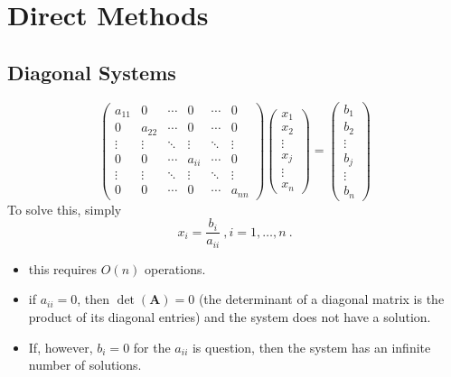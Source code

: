 \documentclass[12pt]{article}
\newcommand{\ve}[1]{\ensuremath{\mathbf{#1}}}
\begin{document}
\section{Direct Methods}

\subsection{Diagonal Systems}
\begin{equation}
   \begin{pmatrix}
      a_{11} & 0      & \cdots & 0      & \cdots & 0 \\
      0      & a_{22} & \cdots & 0      & \cdots & 0 \\
      \vdots & \vdots & \ddots & \vdots & \ddots & \vdots \\     
      0      & 0      & \cdots & a_{ii} & \cdots & 0 \\
      \vdots & \vdots & \ddots & \vdots & \ddots & \vdots \\
      0      & 0      & \cdots & 0      & \cdots & a_{nn} 
    \end{pmatrix} 
    \begin{pmatrix} x_1 \\ x_2 \\ \vdots \\ x_j \\ \vdots \\ x_n \end{pmatrix} =
    \begin{pmatrix} b_1 \\ b_2 \\ \vdots \\ b_j \\ \vdots \\ b_n \end{pmatrix}
    \nonumber   
\end{equation} 
%
To solve this, simply
%
\[x_i = \frac{b_i}{a_{ii}} \:, i=1,\dots,n\:.\]
%
\begin{itemize}
\item this requires $O(n)$ operations.
\item if $a_{ii}=0$, then $\det(\ve{A})=0$ (the determinant of a diagonal matrix is the product of its diagonal entries) and the system does not have a solution.
\item If, however, $b_i = 0$ for the $a_{ii}$ is question, then the system has an infinite number of solutions.
\end{itemize}
\end{document}
